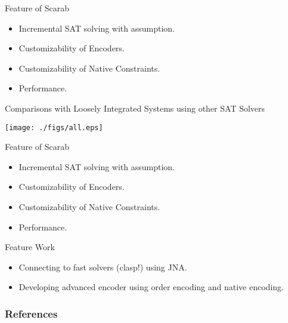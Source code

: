 \documentclass{beamer}
\begin{document}
\begin{frame}{Feature of Scarab}
  \begin{itemize}
  \item Incremental SAT solving with assumption.
  \item Customizability of Encoders.
  \item Customizability of Native Constraints.
  \item Performance.
  \end{itemize}
\end{frame}

\begin{frame}{Comparisons with Loosely Integrated Systems using other SAT Solvers}
\begin{center}
\texttt{[image: ./figs/all.eps]}
\end{center}
\end{frame}

\begin{frame}{Feature of Scarab}
  \begin{itemize}
  \item Incremental SAT solving with assumption.
  \item Customizability of Encoders.
  \item Customizability of Native Constraints.
  \item Performance.
  \end{itemize}

  \begin{block}{Feature Work}
    \begin{itemize}
    \item Connecting to fast solvers (clasp!) using JNA.
    \item Developing advanced encoder using order encoding and native encoding.
    \end{itemize}
  \end{block}
\end{frame}

\begin{frame}[allowframebreaks]
        \frametitle{References}


\end{frame}
\end{document}
